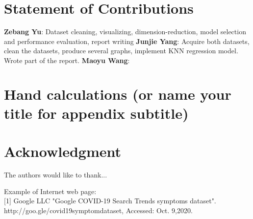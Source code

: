 \documentclass[journal,11pt]{IEEEtran}
\begin{document}
\section{Statement of Contributions}
\textbf{Zebang Yu}: Dataset cleaning, visualizing, dimension-reduction, model selection and performance evaluation, report writing
\newline\indent \textbf{Junjie Yang}: Acquire both datasets, clean the datasets, produce several graphs, implement KNN regression model. Wrote part of the report.
\newline\indent \textbf{Maoyu Wang}:
\appendices
\section{Hand calculations (or name your title for appendix subtitle)}

\section*{Acknowledgment}
The authors would like to thank...




%
%
%


\printbibliography


Example of Internet web page:\\[0.1in]
[1] Google LLC "Google COVID-19 Search Trends symptoms dataset".
http://goo.gle/covid19symptomdataset, Accessed: Oct. 9,2020.


\end{document}
